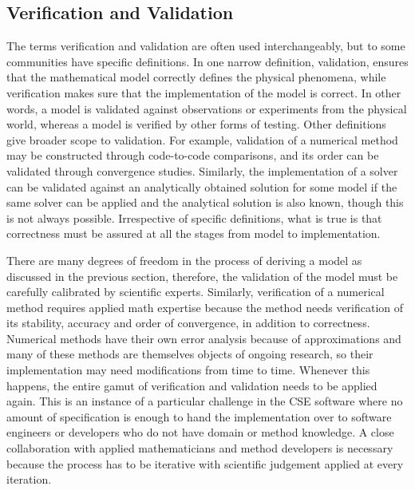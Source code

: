 \subsection{Verification and Validation}
\label{sec:vandv}
The terms verification and
validation are often used interchangeably, but to some communities have specific definitions.  
In one narrow definition, validation, ensures that the
mathematical model correctly defines the physical phenomena, while
verification makes sure that the implementation of the model is
correct. In other words, a model is validated against observations or
experiments from the physical world, whereas a model is verified by
other forms of testing.   Other definitions give broader scope to 
validation. For example, validation of a numerical
method may be constructed through code-to-code comparisons, and its
order can be validated through convergence studies. Similarly, the
implementation of a solver can be validated against an analytically
obtained solution for some model if the same solver can be
applied and the analytical solution is also known, though this is not
always possible.  Irrespective of  specific definitions, what is true is that
correctness must be assured at all the stages from model to
implementation.  

There are many degrees of freedom in the process of deriving a
model as discussed in the previous section, therefore, the validation of the
model must be carefully calibrated by scientific experts. Similarly,
verification of a numerical method requires applied math expertise
because the method needs verification of its stability, accuracy and
order of convergence, in addition to correctness. Numerical methods
have their own error analysis because of approximations and many of
these methods are themselves objects of ongoing research, so their
implementation may need modifications from time to time. Whenever
this happens, the entire gamut of verification and validation needs to
be applied again. This is an instance of a particular challenge in the
CSE software where no amount of specification is enough to hand the
implementation over to software engineers or developers who do not have domain or method knowledge. A close
collaboration with applied mathematicians and method developers is necessary because the process has to be iterative with
scientific judgement applied at every iteration. 

